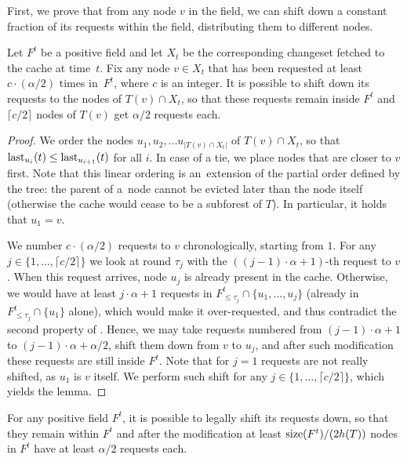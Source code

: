 First, we prove that from any node $v$ in the field, we can shift down a
constant fraction of its requests within the field, distributing them to
different nodes.

\begin{lemma}
\label{lem:downshift}
Let $F^t$ be a positive field and let $X_t$ be the corresponding changeset
fetched to the cache at time~$t$. Fix any node $v \in X_t$ that has been
requested at least $c \cdot (\alpha / 2)$ times in~$F^t$, where $c$ is an
integer. It is possible to shift down its requests to the nodes of $T(v) \cap
X_t$, so that these requests remain inside $F^t$ and $\lceil c / 2 \rceil$
nodes of $T(v)$ get $\alpha / 2$ requests each.
\end{lemma}

\begin{proof}
We order the nodes $u_1, u_2, \ldots u_{|T(v) \cap X_t|}$ of $T(v) \cap X_t$,
so that $\textrm{last}_{u_i}(t) \leq \textrm{last}_{u_{i+1}}(t)$ for all $i$. In case of a
tie, we place nodes that are closer to $v$ first. Note that this linear
ordering is an~extension of the partial order defined by the tree: the parent
of a~node cannot be evicted later than the node itself (otherwise the cache
would cease to be a subforest of $T$). In particular, it holds that $u_1 = v$.

We number $c \cdot (\alpha / 2)$ requests to $v$ chronologically, starting
from $1$. For any $j \in \{1, \ldots, \lceil c/2 \rceil \}$ we look at round
$\tau_j$ with the $((j-1) \cdot \alpha + 1)$-th request to $v$. When this
request arrives, node $u_j$ is already present in the cache. Otherwise, we
would have at least \mbox{$j \cdot \alpha + 1$} requests in $F^t_{\leq
{\tau_j}} \cap \{u_1, \ldots, u_j\}$ (already in $F^t_{\leq {\tau_j}}
\cap \{u_1\}$ alone), which would make it over-requested, and thus contradict
the second property of . Hence, we may
take requests numbered from $(j-1) \cdot \alpha + 1$ to $(j-1) \cdot \alpha +
\alpha/2$, shift them down from $v$ to $u_j$, and after such modification
these requests are still inside $F^t$. Note that for $j = 1$ requests are not
really shifted, as $u_1$ is $v$ itself. We perform such shift for any $j \in
\{1, \ldots, \lceil c/2 \rceil \}$, which yields the lemma.
\end{proof}
  
\begin{lemma}
\label{lem:crucial_lemma_pos}
For any positive field $F^t$, it is possible to legally shift its requests
down, so that they remain within $F^t$ and after the modification at least
$\textrm{size}(F^t)/(2 h(T))$ nodes in $F^t$ have at least $\alpha/2$ requests each.
\end{lemma}

